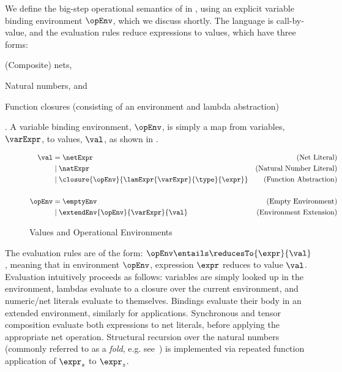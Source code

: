 We define the big-step operational semantics of \DSL{} in ,
using an explicit variable binding environment $\opEnv$, which we discuss
shortly. The language is call-by-value, and the evaluation rules reduce \DSL{}
expressions to values, which have three forms:
\begin{inlinelist}
    \item (Composite) nets,
    \item Natural numbers, and
    \item Function closures (consisting of an environment and lambda
        abstraction)
\end{inlinelist}.  A variable binding environment, $\opEnv$, is simply a map
from variables, $\varExpr$, to values, $\val$, as shown in .

\begin{figure}[ht]
\begin{align*}
    \val &= \netExpr
                   & (\text{Net Literal}) \\
         &\mid \natExpr
                   & (\text{Natural Number Literal}) \\
         &\mid \closure{\opEnv}{\lamExpr{\varExpr}{\type}{\expr}}
                   & (\text{Function Abstraction})\\
\\
    \opEnv &= \emptyEnv
               & (\text{Empty Environment}) \\
           &\mid \extendEnv{\opEnv}{\varExpr}{\val}
               & (\text{Environment Extension})
\end{align*}
\caption{\DSL{} Values and Operational Environments\label{fig:values}}
\end{figure}

The evaluation rules are of the form:
\(
    \opEnv \entails \reducesTo{\expr}{\val}
\), meaning that in environment $\opEnv$, expression $\expr$ reduces to value
$\val$. Evaluation intuitively proceeds as follows: variables are simply looked
up in the environment, lambdas evaluate to a closure over the current
environment, and numeric/net literals evaluate to themselves. Bindings evaluate
their body in an extended environment, similarly for applications. Synchronous
and tensor composition evaluate both expressions to net literals, before
applying the appropriate net operation. Structural recursion over the natural
numbers (commonly referred to as a \emph{fold}, e.g. see~\cite{Hinze2005}) is
implemented via repeated function application of $\expr_s$ to $\expr_z$.

